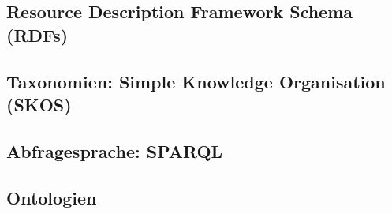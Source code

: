 \documentclass[12pt,a4paper]{article}
\begin{document}
\subsection{Resource Description Framework Schema (RDFs)}

\subsection{Taxonomien: Simple Knowledge Organisation (SKOS)}

\subsection{Abfragesprache: SPARQL}

\subsection{Ontologien}
\end{document}
